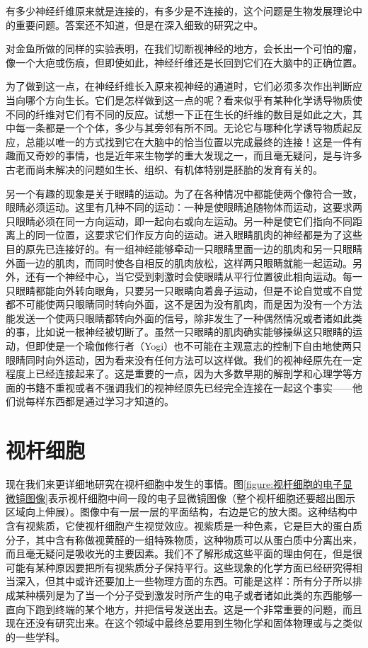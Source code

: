 有多少神经纤维原来就是连接的，有多少是不连接的，这个问题是生物发展理论中的重要问题。答案还不知道，但是在深入细致的研究之中。

对金鱼所做的同样的实验表明，在我们切断视神经的地方，会长出一个可怕的瘤，像一个大疤或伤痕，但即使如此，神经纤维还是长回到它们在大脑中的正确位置。

为了做到这一点，在神经纤维长入原来视神经的通道时，它们必须多次作出判断应当向哪个方向生长。它们是怎样做到这一点的呢？看来似乎有某种化学诱导物质使不同的纤维对它们有不同的反应。试想一下正在生长的纤维的数目是如此之大，其中每一条都是一个个体，多少与其旁邻有所不同。无论它与哪种化学诱导物质起反应，总能以唯一的方式找到它在大脑中的恰当位置以完成最终的连接！这是一件有趣而又奇妙的事情，也是近年来生物学的重大发现之一，而且毫无疑问，是与许多古老而尚未解决的问题如生长、组织、有机体特别是胚胎的发育有关的。

另一个有趣的现象是关于眼睛的运动。为了在各种情况中都能使两个像符合一致，眼睛必须运动。这里有几种不同的运动：一种是使眼睛追随物体而运动，这要求两只眼睛必须在同一方向运动，即一起向右或向左运动。另一种是使它们指向不同距离上的同一位置，这要求它们作反方向的运动。进入眼睛肌肉的神经都是为了这些目的原先已连接好的。有一组神经能够牵动一只眼睛里面一边的肌肉和另一只眼睛外面一边的肌肉，而同时使各自相反的肌肉放松，这样两只眼睛就能一起运动。另外，还有一个神经中心，当它受到刺激时会使眼睛从平行位置彼此相向运动。每一只眼睛都能向外转向眼角，只要另一只眼睛向着鼻子运动，但是不论自觉或不自觉都不可能使两只眼睛同时转向外面，这不是因为没有肌肉，而是因为没有一个方法能发送一个使两只眼睛都转向外面的信号，除非发生了一种偶然情况或者诸如此类的事，比如说一根神经被切断了。虽然一只眼睛的肌肉确实能够操纵这只眼睛的运动，但即使是一个瑜伽修行者（Yogi）也不可能在主观意志的控制下自由地使两只眼睛同时向外运动，因为看来没有任何方法可以这样做。我们的视神经原先在一定程度上已经连接起来了。这是重要的一点，因为大多数早期的解剖学和心理学等方面的书籍不重视或者不强调我们的视神经原先已经完全连接在一起这个事实——他们说每样东西都是通过学习才知道的。

\section{视杆细胞}

现在我们来更详细地研究在视杆细胞中发生的事情。图\ref{figure:视杆细胞的电子显微镜图像}表示视杆细胞中间一段的电子显微镜图像（整个视杆细胞还要超出图示区域向上伸展）。图像中有一层一层的平面结构，右边是它的放大图。这种结构中含有视紫质，它使视杆细胞产生视觉效应。视紫质是一种色素，它是巨大的蛋白质分子，其中含有称做视黄醛的一组特殊物质，这种物质可以从蛋白质中分离出来，而且毫无疑问是吸收光的主要因素。我们不了解形成这些平面的理由何在，但是很可能有某种原因要把所有视紫质分子保持平行。这些现象的化学方面已经研究得相当深入，但其中或许还要加上一些物理方面的东西。可能是这样：所有分子所以排成某种横列是为了当一个分子受到激发时所产生的电子或者诸如此类的东西能够一直向下跑到终端的某个地方，并把信号发送出去。这是一个非常重要的问题，而且现在还没有研究出来。在这个领域中最终总要用到生物化学和固体物理或与之类似的一些学科。


